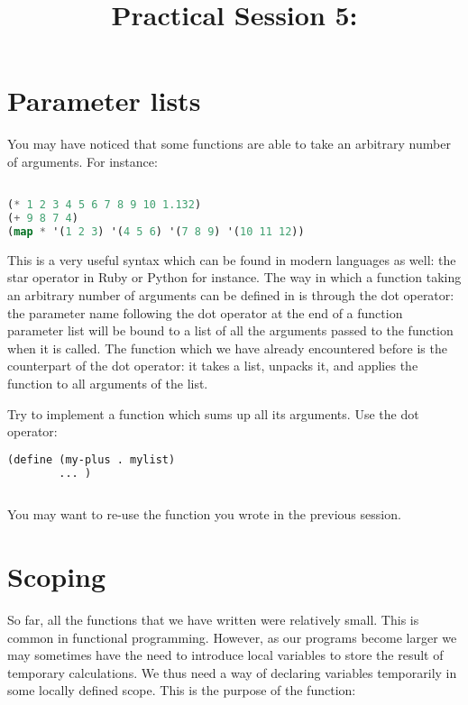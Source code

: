 \documentclass{../../../tp}
\title{Practical Session 5: \scheme}
\author{}
\begin{document}
	
	\maketitle

\section{Parameter lists}

You may have noticed that some \scheme functions are able to take an arbitrary number of arguments. For instance: 

\begin{lstlisting}[language=lisp]

(* 1 2 3 4 5 6 7 8 9 10 1.132)
(+ 9 8 7 4)
(map * '(1 2 3) '(4 5 6) '(7 8 9) '(10 11 12))

\end{lstlisting}

This is a very useful syntax which can be found in modern languages as well: the star operator in Ruby or Python for instance. The way in which a function taking an arbitrary number of arguments can be defined in \scheme is through the dot operator: the parameter name following the dot operator at the end of a function parameter list will be bound to a list of all the arguments passed to the function when it is called. The  function which we have already encountered before is the counterpart of the dot operator: it takes a list, unpacks it, and applies the function to all arguments of the list. 

\begin{instruction}
	Try to implement a  function which sums up all its arguments. Use the dot operator: 
	
	\begin{lstlisting}[language=lisp]
	(define (my-plus . mylist)
		... )
	
	\end{lstlisting}
	
	You may want to re-use the  function you wrote in the previous session.
\end{instruction}


\section{Scoping}

So far, all the functions that we have written were relatively small. This is common in functional programming. However, as our programs become larger we may sometimes have the need to introduce local variables to store the result of temporary calculations. We thus need a way of declaring variables temporarily in some locally defined scope. This is the purpose of the  function:
\end{document}
